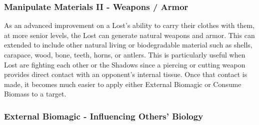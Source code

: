 \documentclass[letterpaper,serif]{rpg-module}
\begin{document}
\subsubsection{Manipulate Materials II - Weapons / Armor} 

As an advanced improvement on a Lost's ability to carry their clothes with them, at more senior levels, the Lost can generate natural weapons and armor. This can extended to include other natural living or biodegradable material such as shells, carapace, wood, bone, teeth, horns, or antlers. This is particularly useful when Lost are fighting each other or the Shadows since a piercing or cutting weapon provides direct contact with an opponent's internal tissue. Once that contact is made, it becomes much easier to apply either External Biomagic or Consume Biomass to a target.

\subsubsection{External Biomagic - Influencing Others' Biology} 
\end{document}
